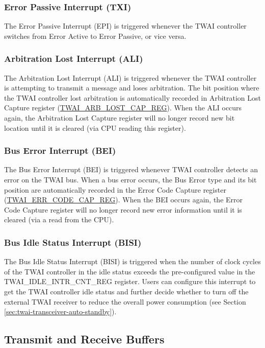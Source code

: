 \documentclass[main\_\_EN.tex]{subfiles}
\begin{document}
\subsubsection{Error Passive Interrupt (TXI)}
The Error Passive Interrupt (EPI) is triggered whenever the TWAI controller switches from Error Active to Error Passive, or vice versa.

\subsubsection{Arbitration Lost Interrupt (ALI)}
The Arbitration Lost Interrupt (ALI) is triggered whenever the TWAI controller is attempting to transmit a message and loses arbitration. The bit position where the TWAI controller lost arbitration is automatically recorded in Arbitration Lost Capture register (\hyperref[regdesc:TWAIARBLOSTCAPREG]{TWAI\_ARB\_LOST\_CAP\_REG}). When the ALI occurs again, the Arbitration Lost Capture register will no longer record new bit location until it is cleared (via CPU reading this register).

\subsubsection{Bus Error Interrupt (BEI)}
The Bus Error Interrupt (BEI) is triggered whenever TWAI controller detects an error on the TWAI bus. When a bus error occurs, the Bus Error type and its bit position are automatically recorded in the Error Code Capture register (\hyperref[regdesc:TWAIERRCODECAPREG]{TWAI\_ERR\_CODE\_CAP\_REG}). When the BEI occurs again, the Error Code Capture register will no longer record new error information until it is cleared (via a read from the CPU).

\subsubsection{Bus Idle Status Interrupt (BISI)}
The Bus Idle Status Interrupt (BISI) is triggered when the number of clock cycles of the TWAI controller in the idle status exceeds the pre-configured value in the TWAI\_IDLE\_INTR\_CNT\_REG register. Users can configure this interrupt to get the TWAI controller idle status and further decide whether to turn off the external TWAI receiver to reduce the overall power consumption (see Section \ref{sec:twai-transceiver-auto-standby}).

\subsection{Transmit and Receive Buffers}
\end{document}
